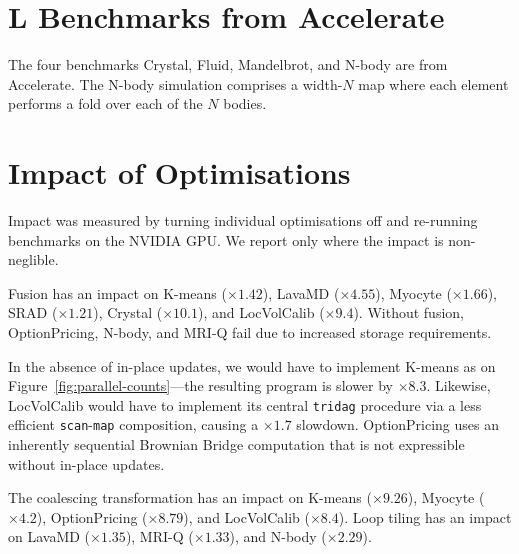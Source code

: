 \section{L Benchmarks from Accelerate}
\label{sec:accelerate}

The four benchmarks Crystal, Fluid, Mandelbrot, and N-body are from
Accelerate.  The N-body simulation comprises a width-$N$ map where
each element performs a fold over each of the $N$ bodies.

\section{Impact of Optimisations}

Impact was measured by turning individual optimisations off and
re-running benchmarks on the NVIDIA GPU.  We report only where
the impact is non-neglible.

Fusion has an impact on K-means ($\times1.42$), LavaMD
($\times4.55$), Myocyte ($\times1.66$), SRAD ($\times1.21$), Crystal
($\times10.1$), and LocVolCalib ($\times9.4$).  Without fusion,
OptionPricing, N-body, and MRI-Q fail due to increased
storage requirements.

In the absence of in-place updates, we would have to implement
K-means as on Figure~\ref{fig:parallel-counts}---the resulting
program is slower by $\times8.3$.  Likewise, LocVolCalib
would have to implement its central \lstinline{tridag} procedure via a
less efficient \lstinline{scan}-\lstinline{map} composition, causing a
$\times1.7$ slowdown.  OptionPricing uses an inherently sequential
Brownian Bridge computation that is not expressible without in-place
updates.

The coalescing transformation has an impact on K-means
($\times9.26$), Myocyte ($\times4.2$), OptionPricing ($\times 8.79$),
and LocVolCalib ($\times 8.4$).
%
Loop tiling has an impact on LavaMD ($\times 1.35$), MRI-Q
($\times1.33$), and N-body ($\times 2.29$).



